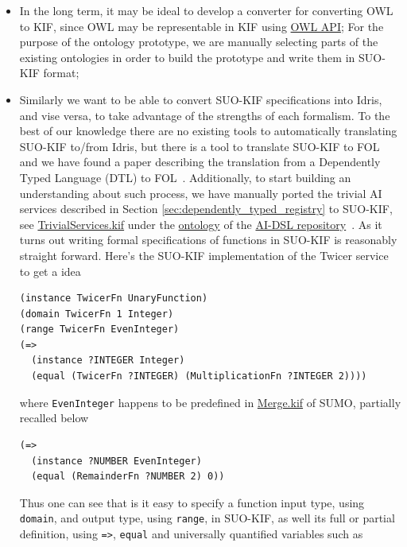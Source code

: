 \documentclass[]{report}
\begin{document}
\begin{itemize}
  \item In the long term, it may be ideal to develop a converter for converting
OWL to KIF, since OWL may be representable in KIF
\cite{martin_translations_nodate}  using \href{https://github.com/owlcs/owlapi}{OWL
	API}; For the purpose of the ontology
prototype, we are manually selecting parts of the existing ontologies in order to build
the prototype and write them in SUO-KIF format;
  \item Similarly we want to be able to convert SUO-KIF specifications
    into Idris, and vise versa, to take advantage of the strengths of
    each formalism.  To the best of our knowledge there are no existing
    tools to automatically translating SUO-KIF to/from Idris, but
    there is a tool to translate SUO-KIF to
    FOL~\cite{Pease_firstorder} and we have found a paper describing
    the translation from a Dependently Typed Language (DTL) to
    FOL~\cite{SojakovaKristina2009}.  Additionally, to start building
    an understanding about such process, we have manually ported the trivial AI
    services described in Section \ref{sec:dependently_typed_registry} to SUO-KIF, see
    \href{https://github.com/singnet/ai-dsl/blob/master/ontology/TrivialServices.kif}{TrivialServices.kif}
    under the
    \href{https://github.com/singnet/ai-dsl/blob/master/ontology}{ontology}
    of the \href{https://github.com/singnet/ai-dsl/}{AI-DSL
      repository}~\cite{AIDSLRepo}.  As it turns out writing formal
    specifications of functions in SUO-KIF is reasonably straight
    forward.  Here's the SUO-KIF implementation of the Twicer service
    to get a idea
\begin{verbatim}
(instance TwicerFn UnaryFunction)
(domain TwicerFn 1 Integer)
(range TwicerFn EvenInteger)
(=>
  (instance ?INTEGER Integer)
  (equal (TwicerFn ?INTEGER) (MultiplicationFn ?INTEGER 2))))
\end{verbatim}
where \texttt{EvenInteger} happens to be predefined in
\href{https://github.com/ontologyportal/sumo/blob/master/Merge.kif}{Merge.kif}
of SUMO, partially recalled below
\begin{verbatim}
(=>
  (instance ?NUMBER EvenInteger)
  (equal (RemainderFn ?NUMBER 2) 0))
\end{verbatim}
Thus one can see that is it easy to specify a function input type,
using \texttt{domain}, and output type, using \texttt{range}, in
SUO-KIF, as well its full or partial definition, using \texttt{=>},
\texttt{equal} and universally quantified variables such as

\end{itemize}
\end{document}
